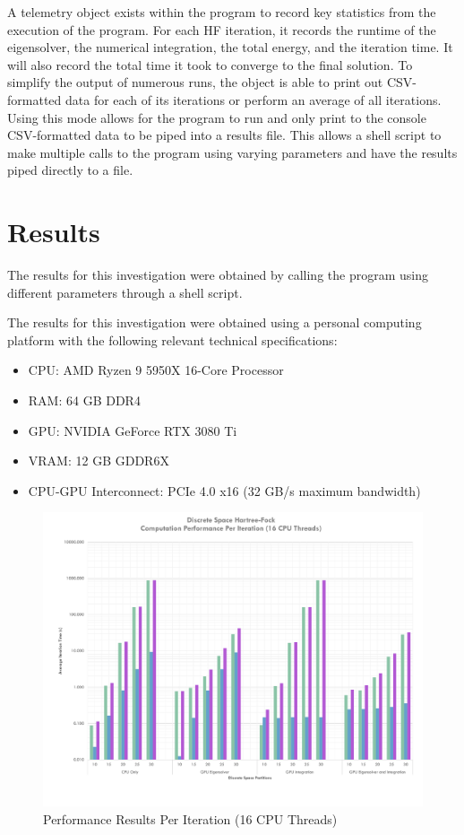 \documentclass[conference, twoside]{IEEEtran}
\begin{document}
A telemetry object exists within the program to record key statistics from the execution of the program. For each HF iteration, it records the runtime of the eigensolver, the numerical integration, the total energy, and the iteration time. It will also record the total time it took to converge to the final solution. To simplify the output of numerous runs, the object is able to print out CSV-formatted data for each of its iterations or perform an average of all iterations. Using this mode allows for the program to run and only print to the console CSV-formatted data to be piped into a results file. This allows a shell script to make multiple calls to the program using varying parameters and have the results piped directly to a file.

\section{Results}

The results for this investigation were obtained by calling the program using different parameters through a shell script.

The results for this investigation were obtained using a personal computing platform with the following relevant technical specifications:

\begin{itemize}
    \item CPU: AMD Ryzen 9 5950X 16-Core Processor
    \item RAM: 64 GB DDR4
    \item GPU: NVIDIA GeForce RTX 3080 Ti
    \item VRAM: 12 GB GDDR6X 
    \item CPU-GPU Interconnect: PCIe 4.0 x16 (32 GB/s maximum bandwidth)
\end{itemize}

\begin{figure}[ht]
\centering
\includegraphics[width=7in]{figures/sixteen-core-results.pdf}
\caption{Performance Results Per Iteration (16 CPU Threads)}
\label{perf-results-per-iteration-sixteen-core}
\end{figure}
\end{document}
